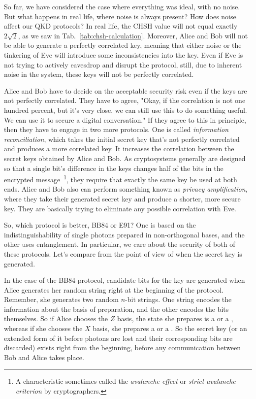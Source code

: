 So far, we have considered the case where everything was ideal, with no noise. But what happens in real life, where noise is always present? How does noise affect our QKD protocols? In real life, the CHSH value will not equal exactly $2\sqrt{2}$, as we saw in Tab.~\ref{tab:chsh-calculation}.  Moreover, Alice and Bob will not be able to generate a perfectly correlated key, meaning that either noise or the tinkering of Eve will introduce some inconsistencies into the key. Even if Eve is not trying to actively eavesdrop and disrupt the protocol, still, due to inherent noise in the system, these keys will not be perfectly correlated.

Alice and Bob have to decide on the acceptable security risk even if the keys are not perfectly correlated. They have to agree, "Okay, if the correlation is not one hundred percent, but it's very close, we can still use this to do something useful. We can use it to secure a digital conversation." If they agree to this in principle, then they have to engage in two more protocols. One is called  \emph{information reconciliation}, which takes the initial secret key that's not perfectly correlated and produces a more correlated key.  It increases the correlation between the secret keys obtained by Alice and Bob.  As cryptosystems generally are designed so that a single bit's difference in the keys changes half of the bits in the encrypted message~\footnote{A characteristic sometimes called the \emph{avalanche effect} or \emph{strict avalanche criterion} by cryptographers.}, they require that exactly the same key be used at both ends.  Alice and Bob also can perform something known as \emph{privacy amplification}, where they take their generated secret key and produce a shorter, more secure key. They are basically trying to eliminate any possible correlation with Eve.

So, which protocol is better, BB84 or E91? One is based on the indistinguishability of single photons prepared in non-orthogonal bases, and the other uses entanglement. In particular, we care about the security of both of these protocols. Let's compare from the point of view of when the secret key is generated.

In the case of the BB84 protocol, candidate bits for the key are generated when Alice generates her random string right at the beginning of the protocol. Remember, she generates two random $n$-bit strings. One string encodes the information about the basis of preparation, and the other encodes the bits themselves. So if Alice chooses the $Z$ basis, the state she prepares is a  or a , whereas if she chooses the $X$ basis, she prepares a \ket{+} or a \ket{-}. So the secret key (or an extended form of it before photons are lost and their corresponding bits are discarded) exists right from the beginning, before any communication between Bob and Alice takes place.


